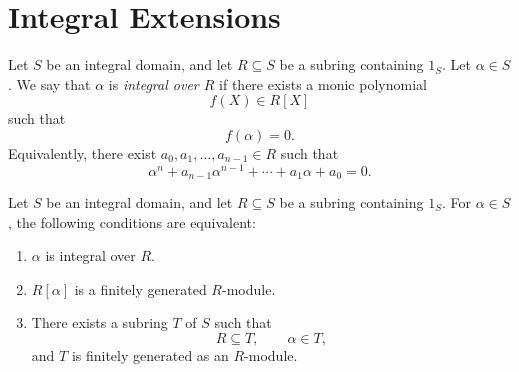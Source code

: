 \section{Integral Extensions}

\begin{definition}
    Let \(S\) be an integral domain, and let \(R\subseteq S\) be a subring containing
    \(1_S\). Let \(\alpha\in S\). We say that \(\alpha\) is \emph{integral over \(R\)}
    if there exists a monic polynomial
    \[
        f(X)\in R[X]
    \]
    such that
    \[
        f(\alpha)=0.
    \]
    Equivalently, there exist \(a_0,a_1,\dots,a_{n-1}\in R\) such that
    \[
        \alpha^n+a_{n-1}\alpha^{n-1}+\cdots+a_1\alpha+a_0=0.
    \]
\end{definition}

\begin{proposition}
    Let \(S\) be an integral domain, and let \(R\subseteq S\) be a subring containing
    \(1_S\). For \(\alpha\in S\), the following conditions are equivalent:
    \begin{enumerate}
        \item \(\alpha\) is integral over \(R\).
        \item \(R[\alpha]\) is a finitely generated \(R\)-module.
        \item There exists a subring \(T\) of \(S\) such that
              \[
                  R\subseteq T,\qquad \alpha\in T,
              \]
              and \(T\) is finitely generated as an \(R\)-module.
    \end{enumerate}
\end{proposition}

